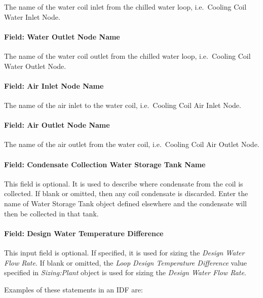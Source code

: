 The name of the water coil inlet from the chilled water loop, i.e.~Cooling Coil Water Inlet Node.

\paragraph{Field: Water Outlet Node Name}\label{field-water-outlet-node-name-3-000}

The name of the water coil outlet from the chilled water loop, i.e.~Cooling Coil Water Outlet Node.

\paragraph{Field: Air Inlet Node Name}\label{field-air-inlet-node-name-8}

The name of the air inlet to the water coil, i.e.~Cooling Coil Air Inlet Node.

\paragraph{Field: Air Outlet Node Name}\label{field-air-outlet-node-name-8-000}

The name of the air outlet from the water coil, i.e.~Cooling Coil Air Outlet Node.

\paragraph{Field: Condensate Collection Water Storage Tank Name}\label{field-condensate-collection-water-storage-tank-name-1}

This field is optional. It is used to describe where condensate from the coil is collected. If blank or omitted, then any coil condensate is discarded. Enter the name of Water Storage Tank object defined elsewhere and the condensate will then be collected in that tank.

\paragraph{Field: Design Water Temperature Difference}\label{field-design-water-temperature-difference}
This input field is optional. If specified, it is used for sizing the \textit{Design Water Flow Rate}. If blank or omitted, the \textit{Loop Design Temperature Difference} value specified in \textit{Sizing:Plant} object is used for sizing the \textit{Design Water Flow Rate}.

Examples of these statements in an IDF are:

